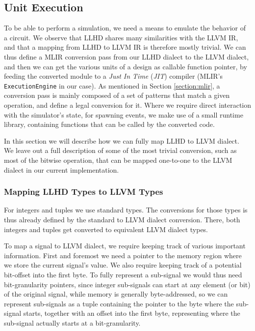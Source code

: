 
\subsection{Unit Execution}
\label{sec:execution}
To be able to perform a simulation, we need a means to emulate the behavior of a circuit. We observe that LLHD shares many similarities with the LLVM IR, and that a mapping from LLHD to LLVM IR is therefore mostly trivial. We can thus define a MLIR conversion pass from our LLHD dialect to the LLVM dialect, and then we can get the various units of a design as callable function pointer, by feeding the converted module to a \textit{Just In Time} (\textit{JIT}) compiler (MLIR's \texttt{ExecutionEngine} in our case). As mentioned in Section \ref{section:mlir}, a conversion pass is mainly composed of a set of patterns that match a given operation, and define a legal conversion for it. Where we require direct interaction with the simulator's state, \eg for spawning events, we make use of a small runtime library, containing functions that can be called by the converted code.

In this section we will describe how we can fully map LLHD to LLVM dialect. We leave out a full description of some of the most trivial conversion, such as most of the bitwise operation, that can be mapped one-to-one to the LLVM dialect in our current implementation.


\subsubsection{Mapping LLHD Types to LLVM Types}
\label{sec:typeconv}
For integers and tuples we use standard types. The conversions for those types is thus already defined by the standard to LLVM dialect conversion. There, both integers and tuples get converted to equivalent LLVM dialect types.

To map a signal to LLVM dialect, we require keeping track of various important information. First and foremost we need a pointer to the memory region where we store the current signal's value. We also require keeping track of a potential bit-offset into the first byte. To fully represent a sub-signal we would thus need bit-granularity pointers, since integer sub-signals can start at any element (or bit) of the original signal, while memory is generally byte-addressed, so we can represent sub-signals as a tuple containing the pointer to the byte where the sub-signal starts, together with an offset into the first byte, representing where the sub-signal actually starts at a bit-granularity.


